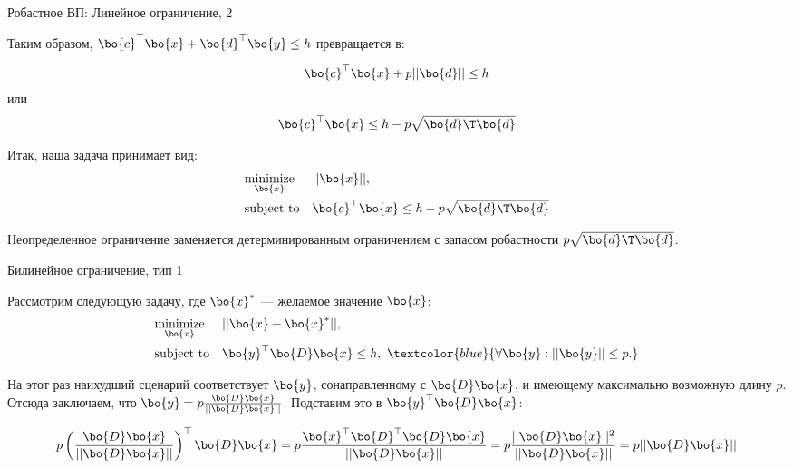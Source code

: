 \documentclass{beamer}
\begin{document}
\begin{frame}{Робастное ВП: Линейное ограничение, 2}
	\begin{flushleft}
		
		Таким образом, $\bo{c}^\top \bo{x} + \bo{d}^\top \bo{y} \leq h$ превращается в:
		
		\begin{align}
			\bo{c}^\top \bo{x} + p || \bo{d} || \leq h 
		\end{align}
		или
		\begin{align}
			\bo{c}^\top \bo{x} \leq h - p \sqrt{ \bo{d}\T  \bo{d}  } 
		\end{align}
		
		\bigskip
		
		Итак, наша задача принимает вид:
		\begin{equation}
			\begin{aligned}
				& \underset{\bo{x}}{\text{minimize}}
				& & ||\bo{x}||, \\
				& \text{subject to}
				& & \bo{c}^\top \bo{x} \leq h - p \sqrt{ \bo{d}\T  \bo{d}  } 
			\end{aligned}
		\end{equation}
		
		\bigskip
		
		Неопределенное ограничение заменяется детерминированным ограничением с запасом робастности $p \sqrt{ \bo{d}\T  \bo{d}  } $.
		
	\end{flushleft}
\end{frame}

\begin{frame}{Билинейное ограничение, тип 1}
	\begin{flushleft}
		
		Рассмотрим следующую задачу, где $\bo{x}^*$ — желаемое значение $\bo{x}$:
		\begin{equation}
			\begin{aligned}
				& \underset{\bo{x}}{\text{minimize}}
				& & ||\bo{x} - \bo{x}^*||, \\
				& \text{subject to}
				& & \bo{y}^\top \bo{D} \bo{x} \leq h, \ 
				\textcolor{blue}{
					\forall \bo{y} :  ||\bo{y}|| \leq p.} 
			\end{aligned}
		\end{equation}
		
		На этот раз наихудший сценарий соответствует $\bo{y}$, сонаправленному с $\bo{D} \bo{x}$, и имеющему максимально возможную длину $p$. Отсюда заключаем, что $\bo{y} = p \frac{\bo{D} \bo{x}}{|| \bo{D} \bo{x} ||} $. Подставим это в $\bo{y}^\top \bo{D} \bo{x}$:
		
		\begin{equation}
			p \left( \frac{\bo{D} \bo{x}}{|| \bo{D} \bo{x} ||} \right)^\top \bo{D} \bo{x} =
			p \frac{\bo{x}^\top \bo{D}^\top \bo{D} \bo{x}}{|| \bo{D} \bo{x} ||} = 
			p \frac{|| \bo{D} \bo{x} ||^2}{|| \bo{D} \bo{x} ||} = 
			p || \bo{D} \bo{x} ||
		\end{equation}
		
		
	\end{flushleft}
\end{frame}
\end{document}
